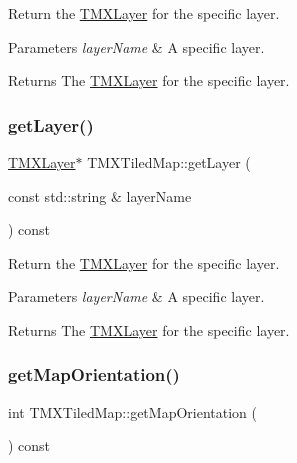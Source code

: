 Return the \hyperlink{classTMXLayer}{T\+M\+X\+Layer} for the specific layer.


\begin{DoxyParams}{Parameters}
{\em layer\+Name} & A specific layer. \\
\hline
\end{DoxyParams}
\begin{DoxyReturn}{Returns}
The \hyperlink{classTMXLayer}{T\+M\+X\+Layer} for the specific layer. 
\end{DoxyReturn}
\mbox{\label{classTMXTiledMap_a5ed4ea1bd0d798e165e5c60f392343b9}} 
\subsubsection{\texorpdfstring{get\+Layer()}{getLayer()}\hspace{0.1cm}{\footnotesize\ttfamily [2/2]}}
{\footnotesize\ttfamily \hyperlink{classTMXLayer}{T\+M\+X\+Layer}$\ast$ T\+M\+X\+Tiled\+Map\+::get\+Layer (\begin{DoxyParamCaption}\item[{const std\+::string \&}]{layer\+Name }\end{DoxyParamCaption}) const}

Return the \hyperlink{classTMXLayer}{T\+M\+X\+Layer} for the specific layer.


\begin{DoxyParams}{Parameters}
{\em layer\+Name} & A specific layer. \\
\hline
\end{DoxyParams}
\begin{DoxyReturn}{Returns}
The \hyperlink{classTMXLayer}{T\+M\+X\+Layer} for the specific layer. 
\end{DoxyReturn}
\mbox{\label{classTMXTiledMap_ae977e941934abd13ab85b260ad915941}} 
\subsubsection{\texorpdfstring{get\+Map\+Orientation()}{getMapOrientation()}\hspace{0.1cm}{\footnotesize\ttfamily [1/2]}}
{\footnotesize\ttfamily int T\+M\+X\+Tiled\+Map\+::get\+Map\+Orientation (\begin{DoxyParamCaption}{ }\end{DoxyParamCaption}) const\hspace{0.3cm}{\ttfamily [inline]}}

